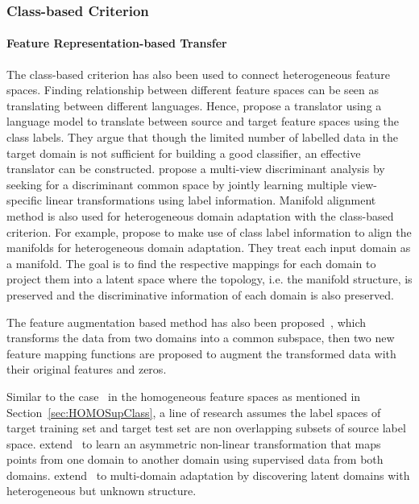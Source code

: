 \documentclass[prodmode]{acmsmall}  %
\begin{document}
\subsubsection{Class-based Criterion}
\paragraph{Feature Representation-based Transfer} 
The class-based criterion has also been used to connect heterogeneous feature spaces. 
Finding relationship between different feature spaces can be seen as translating between different languages. Hence,  propose a translator using a language model to translate between source and target feature spaces using the class labels. They argue that though the limited number of labelled data in the target domain is not sufficient for building a good classifier, an effective translator can be constructed.  propose a multi-view discriminant analysis by seeking for a discriminant common space by jointly learning multiple view-specific linear transformations using label information. Manifold alignment method is also used for heterogeneous domain adaptation with the class-based criterion. 
For example,  propose to make use of class label information to align the manifolds for heterogeneous domain adaptation. They treat each input domain as a manifold. The goal is to find the respective mappings for each domain to project them into a latent space where the topology, i.e. the manifold structure, is preserved and the discriminative information of each domain is also preserved.

The feature augmentation based method has also been proposed~\cite{Duan2012b,Li2014}, which transforms the data from two domains into a common subspace, then two new feature mapping functions are proposed to augment the transformed data with their original features and zeros.

Similar to the case~\cite{Saenko2010} in the homogeneous feature spaces as mentioned in Section~\ref{sec:HOMOSupClass}, a line of research assumes the label spaces of target training set and target test set are non overlapping subsets of source label space.  extend~\cite{Saenko2010} to learn an asymmetric non-linear transformation that maps points from one domain to another domain using supervised data from both domains.
 extend~\cite{Kulis2011} to multi-domain adaptation by discovering latent domains with heterogeneous but unknown structure.
\end{document}
